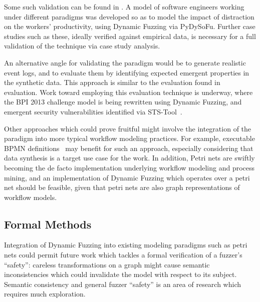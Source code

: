 \documentclass[12pt]{llncs}  %
\begin{document}
Some such validation can be found in \cite{wallis2018modelling}. A model of
software engineers working under different paradigms was developed so as to
model the impact of distraction on the workers' productivity, using Dynamic
Fuzzing via PyDySoFu. Further case studies such as these, ideally verified
against empirical data, is necessary for a full validation of the technique via
case study analysis.
\par

An alternative angle for validating the paradigm would be to generate realistic
event logs, and to evaluate them by identifying expected emergent properties in
the synthetic data. This approach is similar to the evaluation found
in~\cite{accorsi2013secsy} evaluation. Work toward employing this evaluation
technique is underway, where the BPI 2013 challenge model is being
rewritten using Dynamic Fuzzing, and emergent security vulnerabilities
identified via STS-Tool~\citep{salnitri2015sts}.
\par

Other approaches which could prove fruitful might involve the integration of the
paradigm into more typical workflow modeling practices. For example, executable
BPMN definitions~\citep{mitsyuk2017generating} may benefit for such an approach,
especially considering that data synthesis is a target use case for the work. In
addition, Petri nets are swiftly becoming the de facto implementation underlying
workflow modeling and process mining\citep{van1998application}, and an
implementation of Dynamic Fuzzing which operates over a petri net should be
feasible, given that petri nets are also graph representations of workflow
models.
\par

\subsection{Formal Methods}
\label{future_formal_methods_work}

Integration of Dynamic Fuzzing into existing modeling paradigms such as petri
nets could permit future work which tackles a formal verification of a fuzzer's
``safety'': careless transformations on a graph might cause semantic
inconsistencies which could invalidate the model with respect to its
subject. Semantic consistency and general fuzzer ``safety'' is an area
of research which requires much exploration.
\par
\end{document}
